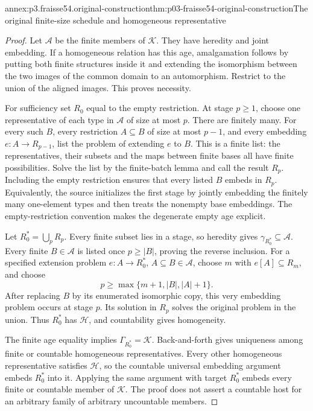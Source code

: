 \begin{annexitem}{annex:p3.fraisse54.original-construction}{thm:p03-fraisse54-original-construction}{The original finite-size schedule and homogeneous representative}
\begin{proof}
Let \(\mathcal A\) be the finite members of \(\mathcal K\). They have
heredity and joint embedding. If a homogeneous relation has this age,
amalgamation follows by putting both finite structures inside it and
extending the isomorphism between the two images of the common domain
to an automorphism. Restrict to the union of the aligned images. This
proves necessity.

For sufficiency set \(R_0\) equal to the empty restriction. At stage
\(p\geq1\), choose one representative of each type in \(\mathcal A\)
of size at most \(p\). There are finitely many. For every such
\(B\), every restriction \(A\subseteq B\) of size at most \(p-1\),
and every embedding \(e:A\to R_{p-1}\), list the problem of extending
\(e\) to \(B\). This is a finite list: the representatives, their
subsets and the maps between finite bases all have finite possibilities.
Solve the list by the finite-batch lemma and call the result \(R_p\).
Including the empty restriction ensures that every listed \(B\) embeds
in \(R_p\). Equivalently, the source initializes the first stage by
jointly embedding the finitely many one-element types and then treats
the nonempty base embeddings. The empty-restriction convention makes
the degenerate empty age explicit.

Let \(R_0^*=\bigcup_pR_p\). Every finite subset lies in a stage, so
heredity gives \(\gamma_{R_0^*}\subseteq\mathcal A\). Every finite
\(B\in\mathcal A\) is listed once \(p\geq\lvert B\rvert\), proving
the reverse inclusion. For a specified extension problem
\(e:A\to R_0^*\), \(A\subseteq B\in\mathcal A\), choose \(m\)
with \(e[A]\subseteq R_m\), and choose
\[
 p\geq\max\{m+1,\lvert B\rvert,\lvert A\rvert+1\}.
\]
After replacing \(B\) by its enumerated isomorphic copy, this very
embedding problem occurs at stage \(p\). Its solution in \(R_p\)
solves the original problem in the union. Thus \(R_0^*\) has
\(\mathcal H\), and countability gives homogeneity.

The finite age equality implies \(\Gamma_{R_0^*}=\mathcal K\).
Back-and-forth gives uniqueness among finite or countable homogeneous
representatives. Every other homogeneous representative satisfies
\(\mathcal H\), so the countable universal embedding argument embeds
\(R_0^*\) into it. Applying the same argument with target \(R_0^*\)
embeds every finite or countable member of \(\mathcal K\). The proof
does not assert a countable host for an arbitrary family of arbitrary
uncountable members.
\end{proof}
\end{annexitem}

